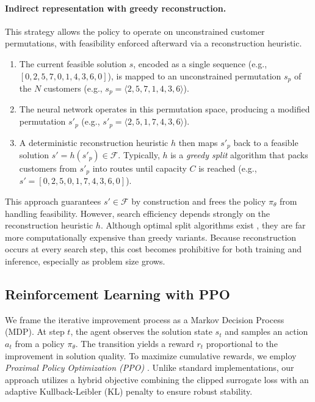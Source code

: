 \documentclass[letterpaper]{article} %
\begin{document}
\paragraph{Indirect representation with greedy reconstruction.}
This strategy allows the policy to operate on unconstrained customer permutations, with feasibility enforced afterward via a reconstruction heuristic.
\begin{enumerate}
    \item The current feasible solution $s$, encoded as a single sequence (e.g., $[0,2,5,7,0,1,4,3,6,0]$), is mapped to an unconstrained permutation $s_p$ of the $N$ customers (e.g., $s_p = \langle 2,5,7,1,4,3,6 \rangle$).
    \item The neural network operates in this permutation space, producing a modified permutation $s'_p$ (e.g., $s'_p = \langle 2,5,1,7,4,3,6 \rangle$).
    \item A deterministic reconstruction heuristic $h$ then maps $s'_p$ back to a feasible solution $s' = h(s'_p) \in \mathcal{F}$.
    Typically, $h$ is a \textit{greedy split} algorithm that packs customers from $s'_p$ into routes until capacity $C$ is reached (e.g., $s' = [0,2,5,0,1,7,4,3,6,0]$).
\end{enumerate}

This approach guarantees $s' \in \mathcal{F}$ by construction and frees the policy $\pi_\theta$ from handling feasibility. However, search efficiency depends strongly on the reconstruction heuristic $h$. Although optimal split algorithms exist \cite{vidal_technical_2016}, they are far more computationally expensive than greedy variants. Because reconstruction occurs at every search step, this cost becomes prohibitive for both training and inference, especially as problem size grows.

\subsection{Reinforcement Learning with PPO}
\label{sec:reinforcement_learning}

We frame the iterative improvement process as a Markov Decision Process (MDP). At step $t$, the agent observes the solution state $s_t$ and samples an action $a_t$ from a policy $\pi_\theta$. The transition yields a reward $r_t$ proportional to the improvement in solution quality. To maximize cumulative rewards, we employ \textit{Proximal Policy Optimization (PPO)} \cite{schulman_proximal_2017}. Unlike standard implementations, our approach utilizes a hybrid objective combining the clipped surrogate loss with an adaptive Kullback-Leibler (KL) penalty to ensure robust stability.
\end{document}
